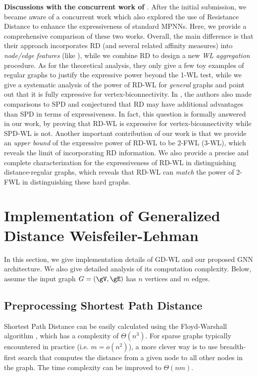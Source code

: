 \documentclass{article} %
\begin{document}
\textbf{Discussions with the concurrent work of \citet{velingker2022affinity}}. After the initial submission, we became aware of a concurrent work \citep{velingker2022affinity} which also explored the use of Resistance Distance to enhance the expressiveness of standard MPNNs. Here, we provide a comprehensive comparison of these two works. Overall, the main difference is that their approach incorporates RD (and several related affinity measures) into \emph{node/edge features} (like \citet{zhang2021nested}), while we combine RD to design a new \emph{WL aggregation} procedure. As for the theoretical analysis, they only give a few toy examples of regular graphs to justify the expressive power beyond the 1-WL test, while we give a systematic analysis of the power of RD-WL for \emph{general} graphs and point out that it is fully expressive for vertex-biconnectivity. In \citet{velingker2022affinity}, the authors also made comparisons to SPD and conjectured that RD may have additional advantages than SPD in terms of expressiveness. In fact, this question is formally answered in our work, by proving that RD-WL is expressive for vertex-biconnectivity while SPD-WL is not. Another important contribution of our work is that we provide an \emph{upper bound} of the expressive power of RD-WL to be 2-FWL (3-WL), which reveals the limit of incorporating RD information. We also provide a precise and complete characterization for the expressiveness of RD-WL in distinguishing distance-regular graphs, which reveals that RD-WL can \emph{match} the power of 2-FWL in distinguishing these hard graphs.


\section{Implementation of Generalized Distance Weisfeiler-Lehman}
\label{sec:detail_of_gdwl}
In this section, we give implementation details of GD-WL and our proposed GNN architecture. We also give detailed analysis of its computation complexity. Below, assume the input graph $G=(\gV,\gE)$ has $n$ vertices and $m$ edges.

\subsection{Preprocessing Shortest Path Distance}
\label{sec:detail_of_spdwl}
Shortest Path Distance can be easily calculated using the Floyd-Warshall algorithm \citep{floyd1962algorithm}, which has a complexity of $\Theta(n^3)$. For sparse graphs typically encountered in practice (i.e. $m=o(n^2)$), a more clever way is to use breadth-first search that computes the distance from a given node to all other nodes in the graph. The time complexity can be improved to $\Theta(nm)$.
\end{document}
